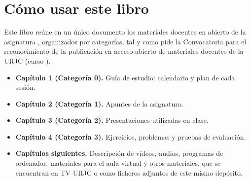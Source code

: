 \chapter*{Cómo usar este libro}

Este libro reúne en un único documento los materiales docentes en abierto de la
asignatura \emph{\nombreTematico}, organizados por categorías, tal y como pide la
Convocatoria para el reconocimiento de la publicación en acceso abierto de
materiales docentes de la URJC (curso \curso).

\begin{itemize}
  \item \textbf{Capítulo 1 (Categoría 0).} Guía de estudio: calendario y plan de cada sesión.
  \item \textbf{Capítulo 2 (Categoría 1).} Apuntes de la asignatura.
  \item \textbf{Capítulo 3 (Categoría 2).} Presentaciones utilizadas en clase.
  \item \textbf{Capítulo 4 (Categoría 3).} Ejercicios, problemas y pruebas de evaluación.
  \item \textbf{Capítulos siguientes.} Descripción de vídeos, audios, programas de
        ordenador, materiales para el aula virtual y otros materiales, que se
        encuentran en TV URJC o como ficheros adjuntos de este mismo depósito.
\end{itemize}

